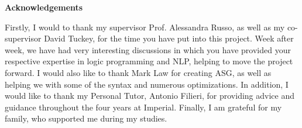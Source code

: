 \newenvironment{acknowledgements}%
    {\thispagestyle{plain}\null\vfill\begin{center}%
    \bfseries Acknowledgements\end{center}}%
    {\vfill\null}
        \begin{acknowledgements}
        Firstly, I would to thank my supervisor Prof. Alessandra Russo, as well as my co-supervisor David Tuckey, for the time you have put into this project. Week after week, we have had very interesting discussions in which you have provided your respective expertise in logic programming and NLP, helping to move the project forward. I would also like to thank Mark Law for creating ASG, as well as helping we with some of the syntax and numerous optimizations. In addition, I would like to thank my Personal Tutor, Antonio Filieri, for providing advice and guidance throughout the four years at Imperial. Finally, I am grateful for my family, who supported me during my studies.
        \end{acknowledgements}